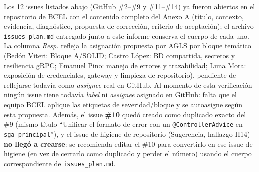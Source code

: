 \documentclass[11pt,a4paper]{article}
\begin{document}
\begin{notebox}[title=Estado de apertura]
Los 12 issues listados abajo (GitHub \#2--\#9 y \#11--\#14) ya fueron abiertos en el repositorio de BCEL con el contenido completo del Anexo A (t\'itulo, contexto, evidencia, diagn\'ostico, propuesta de correcci\'on, criterio de aceptaci\'on); el archivo \texttt{issues\_plan.md} entregado junto a este informe conserva el cuerpo de cada uno. La columna \emph{Resp.} refleja la asignaci\'on propuesta por AGLS por bloque tem\'atico (Bed\'on Viteri: Bloque A/SOLID; Castro L\'opez: BD compartida, secretos y resiliencia gRPC; Emanuel Pino: manejo de errores y trazabilidad; Luna Mora: exposici\'on de credenciales, gateway y limpieza de repositorio), pendiente de reflejarse todav\'ia como \emph{assignee} real en GitHub. Al momento de esta verificaci\'on ning\'un issue tiene todav\'ia \emph{label} ni \emph{assignee} asignado en GitHub: falta que el equipo BCEL aplique las etiquetas de severidad/bloque y se autoasigne seg\'un esta propuesta. Adem\'as, el issue \textbf{\#10} qued\'o creado como duplicado exacto del \#9 (mismo t\'itulo ``Unificar el formato de error con un \texttt{@ControllerAdvice} en \texttt{sga-principal}''), y el issue de higiene de repositorio (Sugerencia, hallazgo H14) \textbf{no lleg\'o a crearse}: se recomienda editar el \#10 para convertirlo en ese issue de higiene (en vez de cerrarlo como duplicado y perder el n\'umero) usando el cuerpo correspondiente de \texttt{issues\_plan.md}.
\end{notebox}
\end{document}
